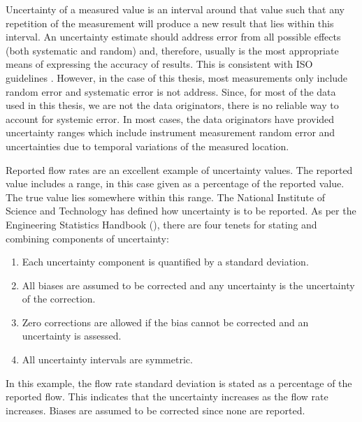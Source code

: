 \begin{linenumbers}
Uncertainty of a measured value is an interval around that value such that any repetition of the measurement will produce a new result that lies within this interval.  An uncertainty estimate should address error from all possible effects (both systematic and random) and, therefore, usually is the most appropriate means of expressing the accuracy of results.  This is consistent with ISO guidelines .  However, in the case of this thesis, most measurements only include random error and systematic error is not address.  Since, for most of the data used in this thesis, we are not the data originators, there is no reliable way to account for systemic error.  In most cases, the data originators have provided uncertainty ranges which include instrument measurement random error and uncertainties due to temporal variations of the measured location.

Reported flow rates are an excellent example of uncertainty values.  The reported value includes a range, in this case given as a percentage of the reported value.  The true value lies somewhere within this range.  The National Institute of Science and Technology has defined how uncertainty is to be reported.  As per the Engineering Statistics Handbook (), there are four tenets for stating and combining components of uncertainty:
\begin{enumerate}
	\item Each uncertainty component is quantified by a standard deviation. \\
	\item All biases are assumed to be corrected and any uncertainty is the uncertainty of the correction. \\
	\item Zero corrections are allowed if the bias cannot be corrected and an uncertainty is assessed. \\
	\item All uncertainty intervals are symmetric.\\
\end{enumerate}

In this example, the flow rate standard deviation is stated as a percentage of the reported flow.  This indicates that the uncertainty increases as the flow rate increases.  Biases are assumed to be corrected since none are reported.  






\end{linenumbers}
